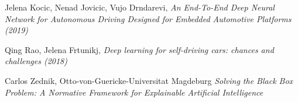 \begin{thebibliography}{9}
Jelena Kocic, Nenad Jovicic, Vujo Drndarevi, \textit{An End-To-End Deep Neural Network for Autonomous Driving Designed for Embedded Automotive Platforms (2019)}

Qing Rao, Jelena Frtunikj, \textit{Deep learning for self-driving cars: chances and challenges (2018)}

Carlos Zednik, Otto-von-Guericke-Universitat Magdeburg \textit{Solving the Black Box Problem: A Normative Framework for Explainable Artificial Intelligence}

\end{thebibliography}